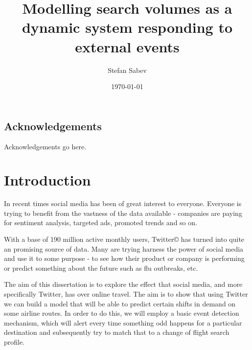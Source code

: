 \documentclass[minf,frontabs,twoside,singlespacing,parskip]{infthesis}
\begin{document}
\title{Modelling search volumes as a dynamic system responding to external events}

\author{Stefan Sabev}


\date{\today}


\maketitle

\section*{Acknowledgements}
Acknowledgements go here. 

\tableofcontents



\chapter{Introduction}

In recent times social media has been of great interest to everyone. Everyone is trying to benefit from the vastness of the data available - companies are paying for sentiment analysis, targeted ads, promoted trends and so on. 

With a base of 190 million active monthly users, Twitter{\copyright} has turned into quite an promising source of data. Many are trying harness the power of social media and use it to some purpose - to see how their product or company is performing or predict something about the future such as flu outbreaks, etc.

The aim of this dissertation is to explore the effect that social media, and more specifically Twitter, has over online travel. The aim is to show that using Twitter we can build a model that will be able to predict certain shifts in demand on some airline routes. In order to do this, we will employ a basic event detection mechanism, which will alert every time something odd happens for a particular destination and subsequently try to match that to a change of flight search profile. 
\end{document}

